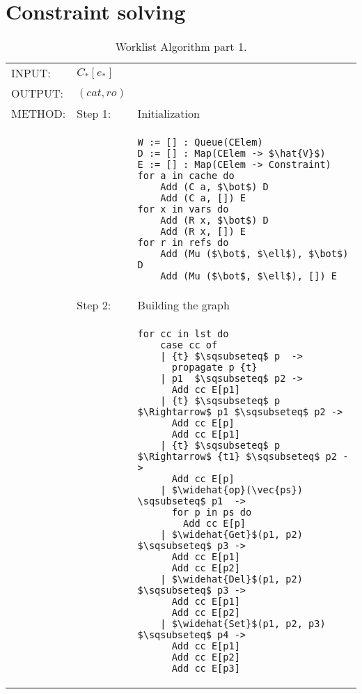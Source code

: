 \section{Constraint solving}
\label{sec:ConstraintSolving}

\begin{table}[htb]
\small
\begin{center}
\begin{tabular}{l l l}
INPUT: & $C_*[e_*]$\\
OUTPUT: & $(cat, ro)$\\
METHOD: &
Step 1:& Initialization\\
&&
\begin{lstlisting}[mathescape]
W := [] : Queue(CElem)
D := [] : Map(CElem -> $\hat{V}$)
E := [] : Map(CElem -> Constraint)
for a in cache do 
    Add (C a, $\bot$) D
    Add (C a, []) E
for x in vars do 
    Add (R x, $\bot$) D
    Add (R x, []) E
for r in refs do 
    Add (Mu ($\bot$, $\ell$), $\bot$) D
    Add (Mu ($\bot$, $\ell$), []) E
\end{lstlisting}\\
&Step 2: & Building the graph\\
&&
\begin{lstlisting}[mathescape]
for cc in lst do
    case cc of
    | {t} $\sqsubseteq$ p  -> 
      propagate p {t}
    | p1  $\sqsubseteq$ p2 -> 
      Add cc E[p1]
    | {t} $\sqsubseteq$ p $\Rightarrow$ p1 $\sqsubseteq$ p2 -> 
      Add cc E[p]
      Add cc E[p1]
    | {t} $\sqsubseteq$ p $\Rightarrow$ {t1} $\sqsubseteq$ p2 -> 
      Add cc E[p]
    | $\widehat{op}(\vec{ps}) \sqsubseteq$ p1  -> 
      for p in ps do
        Add cc E[p]
    | $\widehat{Get}$(p1, p2) $\sqsubseteq$ p3 -> 
      Add cc E[p1]
      Add cc E[p2]
    | $\widehat{Del}$(p1, p2) $\sqsubseteq$ p3 -> 
      Add cc E[p1]
      Add cc E[p2]
    | $\widehat{Set}$(p1, p2, p3) $\sqsubseteq$ p4 -> 
      Add cc E[p1]
      Add cc E[p2]
      Add cc E[p3]
\end{lstlisting}\\
\end{tabular}
\end{center}
\caption{Worklist Algorithm part 1.}
\label{tab:Worklist1}
\end{table}
